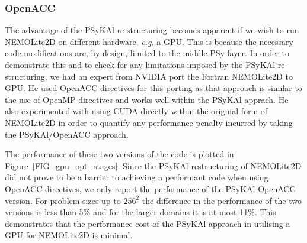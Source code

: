 \documentclass[gmd, manuscript]{copernicus}
\begin{document}


\subsubsection{OpenACC}

The advantage of the {PS}y{KA}l re-structuring becomes apparent if we
wish to run NEMOLite2D on different hardware, \textit{e.g.} a
GPU. This is because the necessary code modifications are, by design,
limited to the middle PSy layer. In order to demonstrate this and to
check for any limitations imposed by the {PS}y{KA}l re-structuring, we
had an expert from NVIDIA port the Fortran NEMOLite2D to GPU. He
used OpenACC directives for this porting as that approach is similar
to the use of OpenMP directives and works well within the {PS}y{KA}l
apprach. He also experimented with using CUDA directly within the
original form of NEMOLite2D in order to quantify any performance
penalty incurred by taking the {PS}y{KA}l/OpenACC approach.

The performance of these two versions of the code is plotted in
Figure~\ref{FIG_gpu_opt_stages}.  Since the {PS}y{KA}l restructuring of
NEMOLite2D did not prove to be a barrier to achieving a performant
code when using OpenACC directives, we only report the performance of
the {PS}y{KA}l OpenACC version. For problem sizes up to $256^2$ the
difference in the performance of the two versions is less than 5\% and
for the larger domains it is at most 11\%. This demonstrates that the
performance cost of the {PS}y{KA}l approach in utilising a GPU for
NEMOLite2D is minimal.
\end{document}
